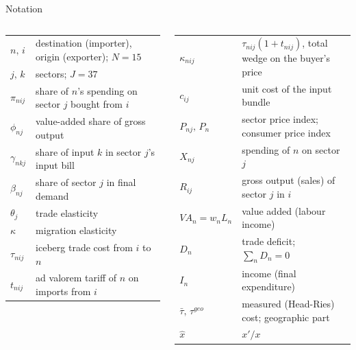 \documentclass[aspectratio=169,9pt,t]{beamer}
\newcommand{\h}[1]{\hat{#1}}
\begin{document}
\begin{frame}{Notation}
  \small
  \begin{columns}[T]
    \begin{column}{0.48\textwidth}
      \begin{tabular}{@{}lL{0.6\textwidth}@{}}
        \toprule
        $n,\,i$ & destination (importer), origin (exporter); $N=15$\\
        $j,\,k$ & sectors; $J=37$\\
        $\pi_{nij}$ & share of $n$'s spending on sector $j$ bought from $i$\\
        $\phi_{nj}$ & value-added share of gross output\\
        $\gamma_{nkj}$ & share of input $k$ in sector $j$'s input bill\\
        $\beta_{nj}$ & share of sector $j$ in final demand\\
        $\theta_j$ & trade elasticity\\
        $\kappa$ & migration elasticity\\
        $\tau_{nij}$ & iceberg trade cost from $i$ to $n$\\
        $t_{nij}$ & ad valorem tariff of $n$ on imports from $i$\\
        \bottomrule
      \end{tabular}
    \end{column}
    \begin{column}{0.48\textwidth}
      \begin{tabular}{@{}lL{0.6\textwidth}@{}}
        \toprule
        $\kappa_{nij}$ & $\tau_{nij}(1+t_{nij})$, total wedge on the buyer's price\\
        $c_{ij}$ & unit cost of the input bundle\\
        $P_{nj},\,P_n$ & sector price index; consumer price index\\
        $X_{nj}$ & spending of $n$ on sector $j$\\
        $R_{ij}$ & gross output (sales) of sector $j$ in $i$\\
        $VA_n=w_nL_n$ & value added (labour income)\\
        $D_n$ & trade deficit; $\sum_nD_n=0$\\
        $I_n$ & income (final expenditure)\\
        $\bar\tau,\,\tau^{geo}$ & measured (Head-Ries) cost; geographic part\\
        $\h x$ & $x'/x$\\
        \bottomrule
      \end{tabular}
    \end{column}
  \end{columns}
\end{frame}
\end{document}
